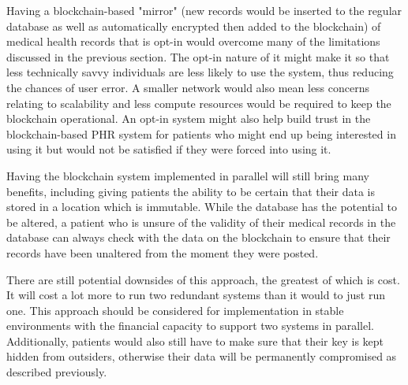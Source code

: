 \documentclass{article}
\begin{document}
Having a blockchain-based "mirror" (new records would be inserted to the regular database as well as automatically encrypted then added to the blockchain) of medical health records that is opt-in would overcome many of the limitations discussed in the previous section. The opt-in nature of it might make it so that less technically savvy individuals are less likely to use the system, thus reducing the chances of user error. A smaller network would also mean less concerns relating to scalability and less compute resources would be required to keep the blockchain operational. An opt-in system might also help build trust in the blockchain-based PHR system for patients who might end up being interested in using it but would not be satisfied if they were forced into using it.

Having the blockchain system implemented in parallel will still bring many benefits, including giving patients the ability to be certain that their data is stored in a location which is immutable. While the database has the potential to be altered, a patient who is unsure of the validity of their medical records in the database can always check with the data on the blockchain to ensure that their records have been unaltered from the moment they were posted. 

There are still potential downsides of this approach, the greatest of which is cost. It will cost a lot more to run two redundant systems than it would to just run one. This approach should be considered for implementation in stable environments with the financial capacity to support two systems in parallel. Additionally, patients would also still have to make sure that their key is kept hidden from outsiders, otherwise their data will be permanently compromised as described previously.



        
\end{document}
